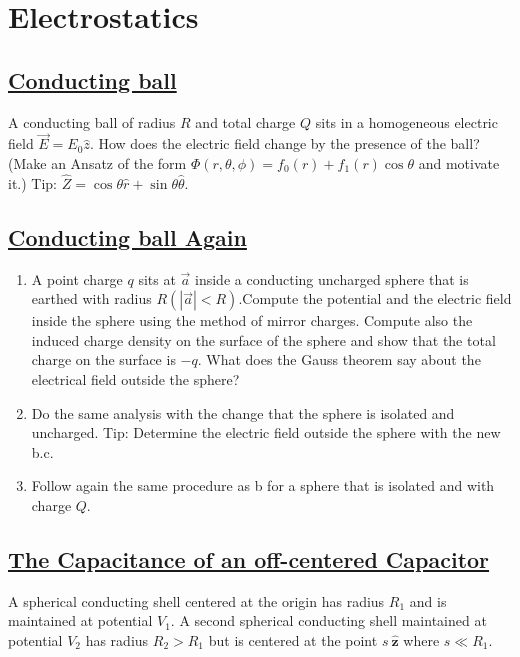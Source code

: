 \section{Electrostatics}

\subsection*{\hyperref[Conducting ball]{Conducting ball}}

A conducting ball of radius $R$ and total charge $Q$ sits in a homogeneous electric field $\vec{E}=E_{0} \hat{z}$. How does the electric field change by the presence of the ball? (Make an Ansatz of the form $\Phi(r, \theta, \phi)=f_{0}(r)+f_{1}(r) \cos \theta$ and motivate it.) Tip: $\hat{Z}=\cos \theta \hat{r}+\sin \theta \hat{\theta}$.

\subsection*{\hyperref[Conducting ball Again]{Conducting ball Again}}

 \begin{enumerate}
	\item A point charge $q$ sits at $\vec{a}$ inside a conducting uncharged sphere that is earthed with radius $R(|\vec{a}|<R)$.Compute the potential and the electric field inside the sphere using the method of mirror charges. Compute also the induced charge density on the surface of the sphere and show that the total charge on the surface is $-q$. What does the Gauss theorem say about the electrical field outside the sphere?
	\item Do the same analysis with the change that the sphere is isolated and uncharged. Tip: Determine the electric field outside the sphere with the new b.c.
	\item Follow again the same procedure as b for a sphere that is isolated and with charge $Q$.
\end{enumerate}

\subsection*{\hyperref[The Capacitance of an off-centered Capacitor]{The Capacitance of an off-centered Capacitor}} 

A spherical conducting shell centered at the origin has radius $R_{1}$ and is maintained at potential $V_{1}$. A second spherical conducting shell maintained at potential $V_{2}$ has radius $R_{2}>R_{1}$ but is centered at the point $s \:\hat{\mathbf{z}}$ where $s \ll R_{1}$.

